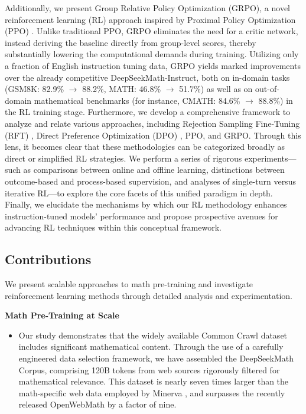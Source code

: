 Additionally, we present Group Relative Policy Optimization (GRPO), a novel reinforcement learning (RL) approach inspired by Proximal Policy Optimization (PPO) \citep{schulman2017proximal}. Unlike traditional PPO, GRPO eliminates the need for a critic network, instead deriving the baseline directly from group-level scores, thereby substantially lowering the computational demands during training. Utilizing only a fraction of English instruction tuning data, GRPO yields marked improvements over the already competitive DeepSeekMath-Instruct, both on in-domain tasks (GSM8K: 82.9\% $\rightarrow$ 88.2\%, MATH: 46.8\% $\rightarrow$ 51.7\%) as well as on out-of-domain mathematical benchmarks (for instance, CMATH: 84.6\% $\rightarrow$ 88.8\%) in the RL training stage. Furthermore, we develop a comprehensive framework to analyze and relate various approaches, including Rejection Sampling Fine-Tuning (RFT) \citep{yuan2023scaling}, Direct Preference Optimization (DPO) \citep{dpo}, PPO, and GRPO. Through this lens, it becomes clear that these methodologies can be categorized broadly as direct or simplified RL strategies. We perform a series of rigorous experiments—such as comparisons between online and offline learning, distinctions between outcome-based and process-based supervision, and analyses of single-turn versus iterative RL—to explore the core facets of this unified paradigm in depth. Finally, we elucidate the mechanisms by which our RL methodology enhances instruction-tuned models’ performance and propose prospective avenues for advancing RL techniques within this conceptual framework.

\subsection{Contributions}
We present scalable approaches to math pre-training and investigate reinforcement learning methods through detailed analysis and experimentation.

\textbf{Math Pre-Training at Scale}

\begin{itemize}[topsep=0pt]
    \item Our study demonstrates that the widely available Common Crawl dataset includes significant mathematical content. Through the use of a carefully engineered data selection framework, we have assembled the DeepSeekMath Corpus, comprising 120B tokens from web sources rigorously filtered for mathematical relevance. This dataset is nearly seven times larger than the math-specific web data employed by Minerva \citep{minerva}, and surpasses the recently released OpenWebMath \citep{openwebmath} by a factor of nine.
\end{itemize}

